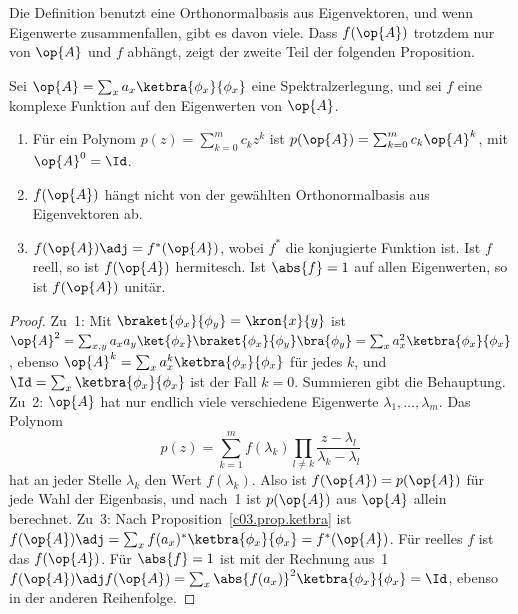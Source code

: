 
Die Definition benutzt eine Orthonormalbasis aus Eigenvektoren, und wenn Eigenwerte zusammenfallen,
gibt es davon viele. Dass $f(\op{A})$ trotzdem nur von $\op{A}$ und $f$ abhängt, zeigt der zweite
Teil der folgenden Proposition.

\begin{proposition}\label{c03.prop.funktion}
  Sei $\op{A} = \sum_x a_x \ketbra{\phi_x}{\phi_x}$ eine Spektralzerlegung, und sei $f$ eine
  komplexe Funktion auf den Eigenwerten von $\op{A}$.
  \begin{enumerate}
    \item Für ein Polynom $p(z) = \sum_{k=0}^{m} c_k z^k$ ist
      $p(\op{A}) = \sum_{k=0}^{m} c_k \op{A}^k$, mit $\op{A}^0 = \Id$.
    \item $f(\op{A})$ hängt nicht von der gewählten Orthonormalbasis aus Eigenvektoren ab.
    \item $f(\op{A})\adj = f^*(\op{A})$, wobei $f^*$ die konjugierte Funktion ist. Ist $f$ reell,
      so ist $f(\op{A})$ hermitesch. Ist $\abs{f} = 1$ auf allen Eigenwerten, so ist
      $f(\op{A})$ unitär.
  \end{enumerate}
\end{proposition}
\begin{proof}
  Zu~1: Mit $\braket{\phi_x}{\phi_y} = \kron{x}{y}$ ist
  $\op{A}^2 = \sum_{x,y} a_x a_y \ket{\phi_x}\braket{\phi_x}{\phi_y}\bra{\phi_y} = \sum_x a_x^2 \ketbra{\phi_x}{\phi_x}$,
  ebenso $\op{A}^k = \sum_x a_x^k \ketbra{\phi_x}{\phi_x}$ für jedes $k$, und
  $\Id = \sum_x \ketbra{\phi_x}{\phi_x}$ ist der Fall $k = 0$. Summieren gibt die Behauptung.
  Zu~2: $\op{A}$ hat nur endlich viele verschiedene Eigenwerte $\lambda_1, \dots, \lambda_m$. Das
  Polynom
  \begin{equation*}
    p(z) = \sum_{k=1}^{m} f(\lambda_k) \prod_{l \neq k} \frac{z - \lambda_l}{\lambda_k - \lambda_l}
  \end{equation*}
  hat an jeder Stelle $\lambda_k$ den Wert $f(\lambda_k)$. Also ist $f(\op{A}) = p(\op{A})$ für
  jede Wahl der Eigenbasis, und nach~1 ist $p(\op{A})$ aus $\op{A}$ allein berechnet. Zu~3:
  Nach Proposition~\ref{c03.prop.ketbra} ist
  $f(\op{A})\adj = \sum_x f(a_x)^* \ketbra{\phi_x}{\phi_x} = f^*(\op{A})$. Für reelles $f$ ist das
  $f(\op{A})$. Für $\abs{f} = 1$ ist mit der Rechnung aus~1
  $f(\op{A})\adj f(\op{A}) = \sum_x \abs{f(a_x)}^2 \ketbra{\phi_x}{\phi_x} = \Id$, ebenso in der
  anderen Reihenfolge.
\end{proof}

